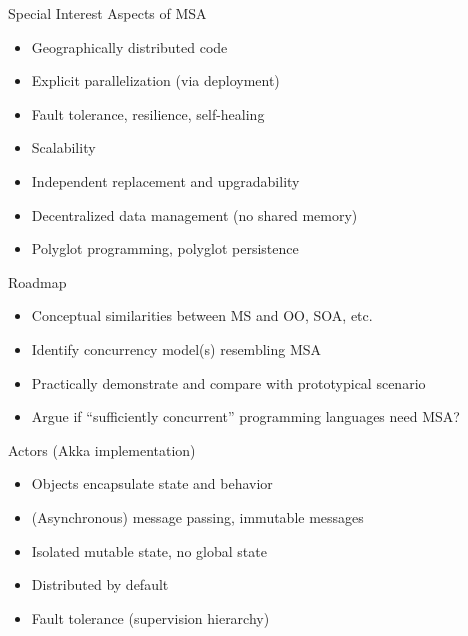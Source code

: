 \documentclass{beamer}
\begin{document}
\begin{frame}{Special Interest Aspects of MSA}

  \begin{itemize}
    \item Geographically distributed code
    \item Explicit parallelization (via deployment)
    \item Fault tolerance, resilience, self-healing
    \item Scalability
    \item Independent replacement and upgradability
    \item Decentralized data management (no shared memory)
    \item Polyglot programming, polyglot persistence
  \end{itemize}

\end{frame}

\begin{frame}{Roadmap}

  \begin{itemize}
    \item Conceptual similarities between MS and OO, SOA, etc.
    \item Identify concurrency model(s) resembling MSA
    \item Practically demonstrate and compare with prototypical scenario
    \item Argue if ``sufficiently concurrent'' programming languages need MSA? 
  \end{itemize}

\end{frame}

\begin{frame}{Actors (Akka implementation)}

  \begin{itemize}
    \item Objects encapsulate state and behavior
    \item (Asynchronous) message passing, immutable messages
    \item Isolated mutable state, no global state
    \item Distributed by default
    \item Fault tolerance (supervision hierarchy)
  \end{itemize}

\end{frame}
\end{document}
